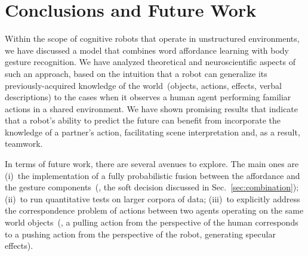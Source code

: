 
\section{Conclusions and Future Work}

Within the scope of cognitive robots that operate in unstructured environments, we have discussed a model that combines word affordance learning with body gesture recognition. We have analyzed theoretical and neuroscientific aspects of such an approach, based on the intuition that a robot can generalize its previously-acquired knowledge of the world~(objects, actions, effects, verbal descriptions) to the cases when it observes a human agent performing familiar actions in a shared \hr{} environment. We have shown promising results that indicate that a robot's ability to predict the future can benefit from incorporate the knowledge of a partner's action, facilitating scene interpretation and, as a result, teamwork.

In terms of future work, there are several avenues to explore. The main ones are (i)~the implementation of a fully probabilistic fusion between the affordance and the gesture components~(\eg, the soft decision discussed in Sec.~\ref{sec:combination}); (ii)~to run quantitative tests on larger corpora of \hr{} data; (iii)~to explicitly address the correspondence problem of actions between two agents operating on the same world objects~(\eg, a pulling action from the perspective of the human corresponds to a pushing action from the perspective of the robot, generating specular effects).
